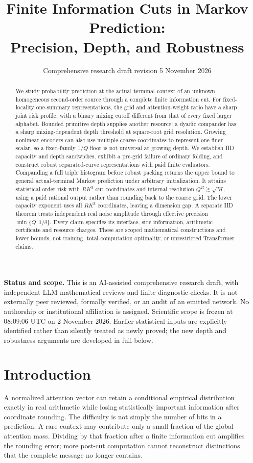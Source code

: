 \documentclass[11pt,letterpaper]{article}
\title{\vspace{-1.4em}Finite Information Cuts in Markov Prediction:\\Precision, Depth, and Robustness}
\author{}
\date{Comprehensive research draft revision 5\quad 2 November 2026}
\theoremstyle{definition}\newtheorem{definition}[theorem]{Definition}
\theoremstyle{remark}\newtheorem{remark}[theorem]{Remark}
\begin{document}
\maketitle\vspace{-1.4em}
\begin{abstract}
We study probability prediction at the actual terminal context of an unknown homogeneous second-order source through a complete finite information cut. For fixed-locality one-summary representations, the grid and attention-weight ratio have a sharp joint risk profile, with a binary mixing cutoff different from that of every fixed larger alphabet. Bounded primitive depth supplies another resource: a dyadic compander has a sharp mixing-dependent depth threshold at square-root grid resolution. Growing nonlinear encoders can also use multiple coarse coordinates to represent one finer scalar, so a fixed-family $1/Q$ floor is not universal at growing depth. We establish IID capacity and depth sandwiches, exhibit a pre-grid failure of ordinary folding, and construct robust separated-curve representations with paid finite evaluators. Companding a full triple histogram before robust packing returns the upper bound to general actual-terminal Markov prediction under arbitrary initialization. It attains statistical-order risk with $RK^3$ cut coordinates and internal resolution $Q^R\gtrsim\sqrt M$, using a paid rational output rather than rounding back to the coarse grid. The lower capacity exponent uses all $RK^3$ coordinates, leaving a dimension gap. A separate IID theorem treats independent real noise amplitude through effective precision $\min\{Q,1/\delta\}$. Every claim specifies its interface, side information, arithmetic certificate and resource charges. These are scoped mathematical constructions and lower bounds, not training, total-computation optimality, or unrestricted Transformer claims.
\end{abstract}
\noindent\textbf{Status and scope.} This is an AI-assisted comprehensive research draft, with independent LLM mathematical reviews and finite diagnostic checks. It is not externally peer reviewed, formally verified, or an audit of an emitted network. No authorship or institutional affiliation is assigned. Scientific scope is frozen at 08:09:06 UTC on 2 November 2026. Earlier statistical inputs are explicitly identified rather than silently treated as newly proved; the new depth and robustness arguments are developed in full below.

\section{Introduction}
A normalized attention vector can retain a conditional empirical distribution exactly in real arithmetic while losing statistically important information after coordinate rounding. The difficulty is not simply the number of bits in a prediction. A rare context may contribute only a small fraction of the global attention mass. Dividing by that fraction after a finite information cut amplifies the rounding error; more post-cut computation cannot reconstruct distinctions that the complete message no longer contains.
\end{document}
